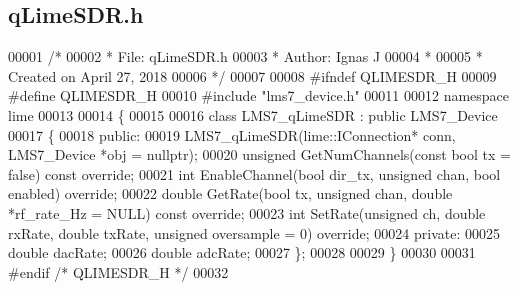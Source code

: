 \subsection{q\+Lime\+S\+D\+R.\+h}
\label{qLimeSDR_8h_source}

\begin{DoxyCode}
00001 \textcolor{comment}{/*}
00002 \textcolor{comment}{ * File:   qLimeSDR.h}
00003 \textcolor{comment}{ * Author: Ignas J}
00004 \textcolor{comment}{ *}
00005 \textcolor{comment}{ * Created on April 27, 2018}
00006 \textcolor{comment}{ */}
00007 
00008 \textcolor{preprocessor}{#ifndef QLIMESDR\_H}
00009 \textcolor{preprocessor}{#define QLIMESDR\_H}
00010 \textcolor{preprocessor}{#include "lms7_device.h"}
00011 
00012 \textcolor{keyword}{namespace }lime
00013 
00014 \{
00015 
00016 \textcolor{keyword}{class }LMS7_qLimeSDR : \textcolor{keyword}{public} LMS7_Device
00017 \{
00018 \textcolor{keyword}{public}:
00019     LMS7_qLimeSDR(lime::IConnection* conn, LMS7_Device *obj = \textcolor{keyword}{nullptr});
00020     \textcolor{keywordtype}{unsigned} GetNumChannels(\textcolor{keyword}{const} \textcolor{keywordtype}{bool} tx = \textcolor{keyword}{false}) \textcolor{keyword}{const override};
00021     \textcolor{keywordtype}{int} EnableChannel(\textcolor{keywordtype}{bool} dir_tx, \textcolor{keywordtype}{unsigned} chan, \textcolor{keywordtype}{bool} enabled) \textcolor{keyword}{override};
00022     \textcolor{keywordtype}{double} GetRate(\textcolor{keywordtype}{bool} tx, \textcolor{keywordtype}{unsigned} chan, \textcolor{keywordtype}{double} *rf\_rate\_Hz = NULL) \textcolor{keyword}{const override};
00023     \textcolor{keywordtype}{int} SetRate(\textcolor{keywordtype}{unsigned} ch, \textcolor{keywordtype}{double} rxRate, \textcolor{keywordtype}{double} txRate, \textcolor{keywordtype}{unsigned} oversample = 0) \textcolor{keyword}{override};
00024 \textcolor{keyword}{private}:
00025     \textcolor{keywordtype}{double} dacRate;
00026     \textcolor{keywordtype}{double} adcRate;
00027 \};
00028 
00029 \}
00030 
00031 \textcolor{preprocessor}{#endif  }\textcolor{comment}{/* QLIMESDR\_H */}\textcolor{preprocessor}{}
00032 
\end{DoxyCode}
